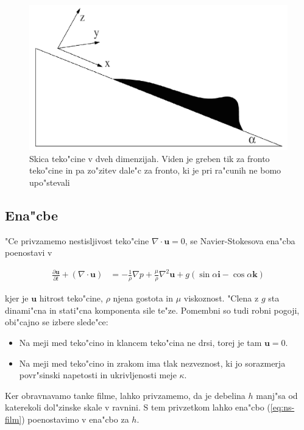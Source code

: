 \documentclass[a4paper,10pt]{article}
\renewcommand{\vec}{\mathbf}
\begin{document}
\begin{figure}[h]
\centering
 \includegraphics[width=.8\textwidth]{./Slike/film-skica}
\caption{Skica teko"cine v dveh dimenzijah. Viden je greben tik za fronto teko"cine in pa zo"zitev dale"c za fronto, ki je pri ra"cunih ne bomo upo"stevali}
\label{fig:film-skica}
\end{figure}

\subsection{Ena"cbe}

"Ce privzamemo nestisljivost teko"cine $\nabla \cdot \vec u = 0$, se Navier-Stokesova ena"cba poenostavi v 

\begin{align}
 \label{eq:ns-film}
 \frac{\partial \vec u}{\partial t} + (\nabla \cdot \vec u) &= -\frac{1}{\rho}\nabla p + \frac{\mu}{\rho}\nabla^2 \vec u + g (\sin \alpha \vec i - \cos \alpha \vec k)
\end{align}

kjer je $\vec u$ hitrost teko"cine, $\rho$ njena gostota in $\mu$ viskoznost. "Clena z $g$ sta dinami"cna in stati"cna komponenta sile te"ze. Pomembni so tudi robni pogoji, obi"cajno se izbere slede"ce:

\begin{itemize}
 \item Na meji med teko"cino in klancem teko"cina ne drsi, torej je tam $\vec u = 0$. 
 \item Na meji med teko"cino in zrakom ima tlak nezveznost, ki jo sorazmerja povr"sinski napetosti in ukrivljenosti meje $\kappa$. 
\end{itemize}

Ker obravnavamo tanke filme, lahko privzamemo, da je debelina $h$ manj"sa od katerekoli dol"zinske skale v ravnini. S tem privzetkom lahko ena"cbo (\ref{eq:ns-film}) poenostavimo v ena"cbo za $h$. 
\end{document}
